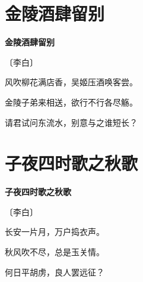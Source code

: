 \documentclass[12pt,UTF-8,openany,fontset=none]{ctexbook}
\begin{document}
\vspace{8pt}
\clearpage

\section{金陵酒肆留别}


\begin{center}
    {\bfseries 金陵酒肆留别}

    \vspace{18pt}

    \begin{large}\xuwen
        〔李白〕
    \end{large}

\end{center}

    \vspace{18pt}

\begin{center}
    \begin{Large}

        风吹柳花满店香，吴姬压酒唤客尝。

        金陵子弟来相送，欲行不行各尽觞。

        请君试问东流水，别意与之谁短长？

    \end{Large}

\end{center}

\vspace{8pt}
\clearpage

\section{子夜四时歌之秋歌}


\begin{center}
    {\bfseries 子夜四时歌之秋歌}

    \vspace{18pt}

    \begin{large}\xuwen
        〔李白〕
    \end{large}

\end{center}

    \vspace{18pt}

\begin{center}
    \begin{Large}

        长安一片月，万户捣衣声。

        秋风吹不尽，总是玉关情。

        何日平胡虏，良人罢远征？

    \end{Large}

\end{center}
\end{document}

